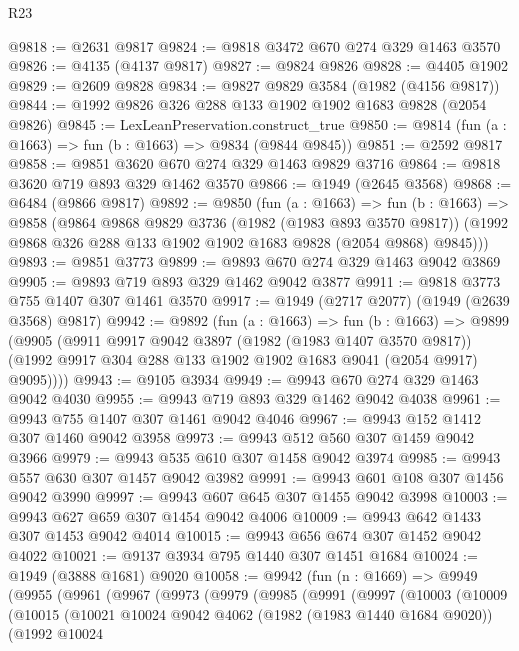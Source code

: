\begin{lexlean}{R23}
\begin{coremodule}
@9818 := @2631 @9817
@9824 := @9818 @3472 @670 @274 @329 @1463 @3570
@9826 := @4135 (@4137 @9817)
@9827 := @9824 @9826
@9828 := @4405 @1902
@9829 := @2609 @9828
@9834 := @9827 @9829 @3584 (@1982 (@4156 @9817))
@9844 := @1992 @9826 @326 @288 @133 @1902 @1902 @1683 @9828 (@2054 @9826)
@9845 := LexLeanPreservation.construct_true
@9850 := @9814 (fun (a : @1663) => fun (b : @1663) => @9834 (@9844 @9845))
@9851 := @2592 @9817
@9858 := @9851 @3620 @670 @274 @329 @1463 @9829 @3716
@9864 := @9818 @3620 @719 @893 @329 @1462 @3570
@9866 := @1949 (@2645 @3568)
@9868 := @6484 (@9866 @9817)
@9892 := @9850
    (fun (a : @1663) =>
    fun (b : @1663) =>
    @9858
      (@9864
        @9868
        @9829
        @3736
        (@1982 (@1983 @893 @3570 @9817))
        (@1992 @9868 @326 @288 @133 @1902 @1902 @1683 @9828 (@2054 @9868) @9845)))
@9893 := @9851 @3773
@9899 := @9893 @670 @274 @329 @1463 @9042 @3869
@9905 := @9893 @719 @893 @329 @1462 @9042 @3877
@9911 := @9818 @3773 @755 @1407 @307 @1461 @3570
@9917 := @1949 (@2717 @2077) (@1949 (@2639 @3568) @9817)
@9942 := @9892
    (fun (a : @1663) =>
    fun (b : @1663) =>
    @9899
      (@9905
        (@9911
          @9917
          @9042
          @3897
          (@1982 (@1983 @1407 @3570 @9817))
          (@1992 @9917 @304 @288 @133 @1902 @1902 @1683 @9041 (@2054 @9917) @9095))))
@9943 := @9105 @3934
@9949 := @9943 @670 @274 @329 @1463 @9042 @4030
@9955 := @9943 @719 @893 @329 @1462 @9042 @4038
@9961 := @9943 @755 @1407 @307 @1461 @9042 @4046
@9967 := @9943 @152 @1412 @307 @1460 @9042 @3958
@9973 := @9943 @512 @560 @307 @1459 @9042 @3966
@9979 := @9943 @535 @610 @307 @1458 @9042 @3974
@9985 := @9943 @557 @630 @307 @1457 @9042 @3982
@9991 := @9943 @601 @108 @307 @1456 @9042 @3990
@9997 := @9943 @607 @645 @307 @1455 @9042 @3998
@10003 := @9943 @627 @659 @307 @1454 @9042 @4006
@10009 := @9943 @642 @1433 @307 @1453 @9042 @4014
@10015 := @9943 @656 @674 @307 @1452 @9042 @4022
@10021 := @9137 @3934 @795 @1440 @307 @1451 @1684
@10024 := @1949 (@3888 @1681) @9020
@10058 := @9942
    (fun (n : @1669) =>
    @9949
      (@9955
        (@9961
          (@9967
            (@9973
              (@9979
                (@9985
                  (@9991
                    (@9997
                      (@10003
                        (@10009
                          (@10015
                            (@10021
                              @10024
                              @9042
                              @4062
                              (@1982 (@1983 @1440 @1684 @9020))
                              (@1992
                                @10024

\end{coremodule}
\end{lexlean}
